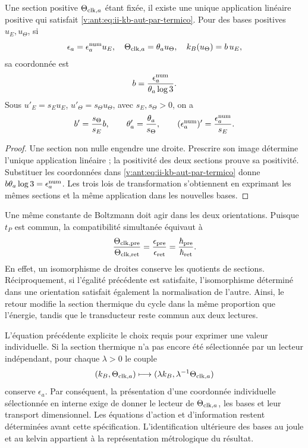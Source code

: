 \begin{theorem}
Une section positive \(\Theta_{{\rm clk},a}\) étant fixée, il existe une unique application linéaire positive qui satisfait \eqref{v:ant:eq:ii-kb-aut-par-termico}. Pour des bases positives \(u_E,u_\Theta\), si
\[
 \epsilon_a=\epsilon_a^{\rm num}u_E,\quad
 \Theta_{{\rm clk},a}=\theta_a u_\Theta,\quad
 k_B(u_\Theta)=b\,u_E,
\]
sa coordonnée est
\begin{equation}
 b=\frac{\epsilon_a^{\rm num}}{\theta_a\log3}.
 \label{v:ant:eq:ii-kb-aut-coordenada}
\end{equation}
Sous \(u'_E=s_Eu_E\), \(u'_\Theta=s_\Theta u_\Theta\), avec
\(s_E,s_\Theta>0\), on a
\[
 b'=\frac{s_\Theta}{s_E}b,\qquad
 \theta'_a=\frac{\theta_a}{s_\Theta},\qquad
 (\epsilon_a^{\rm num})'=\frac{\epsilon_a^{\rm num}}{s_E}.
\]
\end{theorem}
\begin{proof}
Une section non nulle engendre une droite. Prescrire son image détermine
l'unique application linéaire ; la positivité des deux sections prouve
sa positivité. Substituer les coordonnées dans
\eqref{v:ant:eq:ii-kb-aut-par-termico} donne
\(b\theta_a\log3=\epsilon_a^{\rm num}\). Les trois lois de
transformation s'obtiennent en exprimant les mêmes sections et la même
application dans les nouvelles bases.
\end{proof}

Une même constante de Boltzmann doit agir dans les deux orientations.
Puisque \(t_P\) est commun, la compatibilité simultanée équivaut à
\begin{equation}
 \frac{\Theta_{{\rm clk},{\rm pre}}}{\Theta_{{\rm clk},{\rm ret}}}
 =\frac{\epsilon_{\rm pre}}{\epsilon_{\rm ret}}
 =\frac{\hbar_{\rm pre}}{\hbar_{\rm ret}}.
 \label{v:ant:eq:ii-kb-aut-orientaciones}
\end{equation}
En effet, un isomorphisme de droites conserve les quotients de sections. Réciproquement, si l'égalité précédente est satisfaite, l'isomorphisme déterminé dans une orientation satisfait également la normalisation de l'autre. Ainsi, le retour modifie la section thermique du cycle dans la même proportion que l'énergie, tandis que le transducteur reste commun aux deux lectures.

L’équation précédente explicite le choix requis pour exprimer une
valeur individuelle. Si la section thermique n’a pas encore été sélectionnée
par un lecteur indépendant, pour chaque \(\lambda>0\) le couple
\[
 (k_B,\Theta_{{\rm clk},a})
 \longmapsto(\lambda k_B,\lambda^{-1}\Theta_{{\rm clk},a})
\]
conserve \(\epsilon_a\). Par conséquent, la présentation d’une
coordonnée individuelle sélectionnée en interne exige de donner le lecteur de
\(\Theta_{{\rm clk},a}\), les bases et leur transport dimensionnel.
Les équations d’action et d’information restent déterminées avant
cette spécification. L’identification ultérieure des bases au
joule et au kelvin appartient à la représentation métrologique du résultat.

